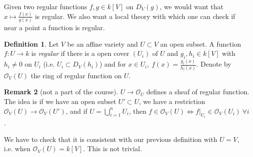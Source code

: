 \documentclass{article}
\theoremstyle{definition}
\newtheorem{defn}{Definition}[subsection]
\newtheorem{remark}[defn]{Remark}
\begin{document}
Given two regular functions $f,g\in k[V]$ on $D_V(g)$, we would want that $x\mapsto\frac{f(x)}{g(x)}$ is regular. We also want a local theory with which one can check if near a point a function is regular.

\begin{defn}
Let $V$ be an affine variety and $U\subset V$ an open subset. A function $f:U\rightarrow k$ is \textit{regular} if there is a open cover $(U_i)$ of $U$ and $g_i,h_i\in k[V]$ with $h_i\neq 0$ on $U_i$ (i.e. $U_i\subset D_V(h_i)$) and for $x\in U_i,\ f(x)=\frac{g_i(x)}{h_i(x)}$. Denote by $\mathcal O_V(U)$ the ring of regular function on $U$.
\end{defn}

\begin{remark}[not a part of the course]
$U\rightarrow\mathcal O_U$ defines a sheaf of regular function. The idea is if we have an open subset $U'\subset U$, we have a restriction $\mathcal O_V(U)\rightarrow\mathcal O_V(U')$, and if $U=\bigcup_{i=1}^n U_i$, then $f\in\mathcal O_V(U)\iff\left. f\right|_{U_i}\in\mathcal O_V(U_i) \ \forall i$.
\end{remark}

We have to check that it is consistent with our previous definition with $U=V$, i.e. when $\mathcal O_V(U)=k[V]$. This is not trivial.
\end{document}
